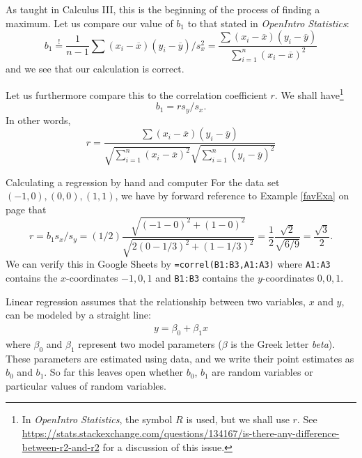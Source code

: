 
	As taught in Calculus III, this is the beginning of the process of finding a maximum.
	Let us compare our value of $b_1$ to that stated in \emph{OpenIntro Statistics}:
	\begin{equation}
		b_1 \overset{!}{=} \frac1{n-1}\sum (x_i-\overline x)(y_i-\overline y)/s_x^2
		= \frac{\sum (x_i-\overline x)(y_i-\overline y)}{\sum_{i=1}^n (x_i-\overline x)^2}
	\end{equation}
	and we see that our calculation is correct.


	Let us furthermore compare this to the correlation coefficient $r$.
	We shall have\footnote{
		In \emph{OpenIntro Statistics}, the symbol $R$ is used, but we shall use $r$.
		See \url{https://stats.stackexchange.com/questions/134167/is-there-any-difference-between-r2-and-r2} for a discussion of this issue.
	}
	\[
		b_1=r s_y/s_x.
	\]
	In other words,
	\[
		r = \frac{\sum (x_i-\overline x)(y_i-\overline y)}{\sqrt{\sum_{i=1}^n (x_i-\overline x)^2}\sqrt{\sum_{i=1}^n (y_i-\overline y)^2}}
	\]
	\begin{example}{Calculating a regression by hand and computer}
		For the data set $(-1,0), (0,0), (1,1)$, we have by forward reference to Example \ref{favExa} on page \pageref{favExa} that
		\[
			r = b_1 s_x/s_y = (1/2) \frac{\sqrt{(-1-0)^2+(1-0)^2}}{\sqrt{2(0-1/3)^2+(1-1/3)^2}} = \frac12 \frac{\sqrt 2}{\sqrt{6/9}} = \frac{\sqrt{3}}{2}.
		\]
		We can verify this in Google Sheets by \texttt{=correl(B1:B3,A1:A3)}
		where \texttt{A1:A3} contains the $x$-coordinates $-1,0,1$ and \texttt{B1:B3} contains the $y$-coordinates $0,0,1$.
	\end{example}


	Linear regression assumes that the relationship between two variables, $x$ and $y$, can be modeled by a straight line:
	\begin{eqnarray}
	y = \beta_0 + \beta_1x
	\label{genLinModelWNoErrorTerm}
	\end{eqnarray}
	where $\beta_0$ and $\beta_1$ represent two model parameters ($\beta$ is the Greek letter \emph{beta}). These parameters are estimated using data, and we write their point estimates as $b_0$ and $b_1$. So far this leaves open whether $b_0$, $b_1$ are random variables or particular values of random variables.

